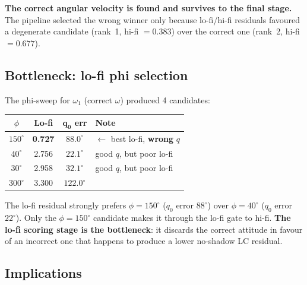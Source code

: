 \documentclass[11pt,a4paper]{article}
\begin{document}
\noindent \textbf{The correct angular velocity is found and survives to the final stage.}
The pipeline selected the wrong winner only because lo-fi/hi-fi residuals
favoured a degenerate candidate (rank~1, hi-fi $= 0.383$) over the correct one
(rank~2, hi-fi $= 0.677$).

\subsection*{Bottleneck: lo-fi phi selection}

The phi-sweep for $\omega_1$ (correct $\omega$) produced 4 candidates:

\begin{center}
\begin{tabular}{@{}cccl@{}}
\toprule
$\phi$ & \textbf{Lo-fi} & $\boldsymbol{q_0}$ \textbf{err} & \textbf{Note} \\
\midrule
$150^\circ$ & \textbf{0.727} & $88.0^\circ$ & $\leftarrow$ best lo-fi, \textbf{wrong} $q$ \\
$40^\circ$ & 2.756 & $22.1^\circ$ & good $q$, but poor lo-fi \\
$30^\circ$ & 2.958 & $32.1^\circ$ & good $q$, but poor lo-fi \\
$300^\circ$ & 3.300 & $122.0^\circ$ & \\
\bottomrule
\end{tabular}
\end{center}

\noindent The lo-fi residual strongly prefers $\phi = 150^\circ$ ($q_0$ error $88^\circ$)
over $\phi = 40^\circ$ ($q_0$ error $22^\circ$). Only the $\phi{=}150^\circ$ candidate
makes it through the lo-fi gate to hi-fi. \textbf{The lo-fi scoring stage is the
bottleneck}: it discards the correct attitude in favour of an incorrect one that
happens to produce a lower no-shadow LC residual.

\subsection*{Implications}
\end{document}
